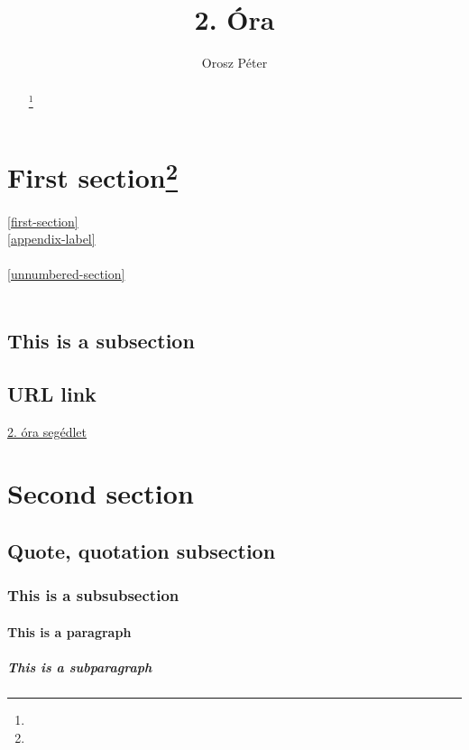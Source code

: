 \documentclass[twoside,12pt]{article}
\title{2. Óra}
\author{Orosz Péter}
\begin{document}
	\maketitle
	\begin{abstract}
		 \lipsum[1]
		 \footnote{\lipsum[1]}
	\end{abstract}
	\tableofcontents
	\newpage
	\section[Fs]{First section\footnote{\lipsum[1]}}
		\ref{first-section}\\
		\ref{appendix-label}\\
		\pageref{subparagraph-label}\\
		\ref{unnumbered-section}\\
		\marginpar{\lipsum[1]}
		\lipsum[1]\\
		\label{first-section}
		\lipsum[1]
		\subsection{This is a subsection}
			\lipsum[2-3]
		\subsection{URL link}
			\href{https://www.uni-miskolc.hu/~viktoria.vadon/TEX/2het/2_dokszerk_folyt.pdf}{2. óra segédlet}
		
	\section{Second section}
		\subsection{Quote, quotation subsection}
			\lipsum[1]
			\begin{quote}
				\lipsum[1]
			\end{quote}
			\lipsum[1]
			\begin{quotation}
				\lipsum[1]
			\end{quotation}
			\subsubsection{This is a subsubsection}
				\paragraph{This is a paragraph}
					\subparagraph{This is a subparagraph}
						\label{subparagraph-label}
		\marginpar{\lipsum[1]}
\end{document}
